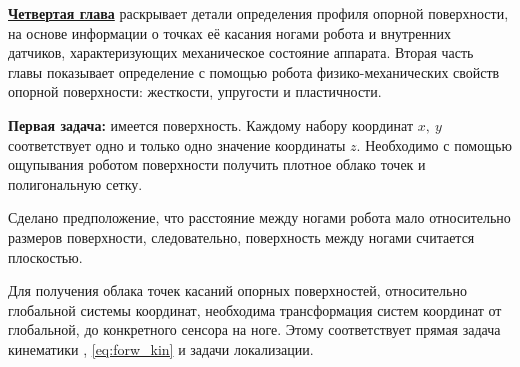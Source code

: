 
\textbf{\underline{Четвертая глава}} раскрывает детали определения профиля опорной поверхности, на основе информации о точках её касания ногами робота и внутренних датчиков, характеризующих механическое состояние аппарата. Вторая часть главы показывает определение с помощью робота физико-механических свойств опорной поверхности:
жесткости, упругости и пластичности.

\textbf{Первая задача:} имеется поверхность. Каждому набору координат $x,\ y$ соответствует одно и только одно значение координаты $z$. Необходимо с помощью ощупывания роботом поверхности получить плотное облако точек и полигональную сетку. 

Сделано предположение, что расстояние между ногами робота мало относительно размеров поверхности, следовательно, поверхность между ногами считается плоскостью.

Для получения облака точек касаний опорных поверхностей, относительно глобальной системы координат, необходима трансформация систем координат от глобальной, до конкретного сенсора на ноге. Этому соответствует прямая задача кинематики , \eqref{eq:forw_kin} и задачи локализации.

